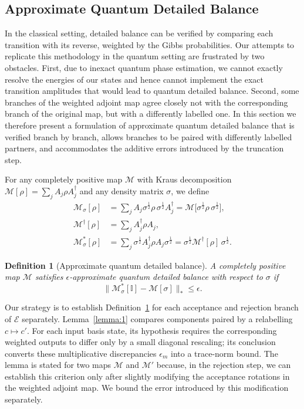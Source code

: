 \documentclass[aps,floatfix,10pt,amssymb,amsfont,amsmath,superscriptaddress,float,nofootinbib,longbibliography,nobalancelastpage,twocolumn]{revtex4-2}
\newtheorem{definition}{Definition}
\begin{document}
\subsection{Approximate Quantum Detailed Balance}
\label{section:detailedbalancedef}
In the classical setting, detailed balance can be verified by comparing each transition with its reverse, weighted by the Gibbs probabilities. Our attempts to replicate this methodology in the quantum setting are frustrated by two obstacles. First, due to inexact quantum phase estimation, we cannot exactly resolve the energies of our states and hence cannot implement the exact transition amplitudes that would lead to quantum detailed balance. Second, some branches of the weighted adjoint map agree closely not with the corresponding branch of the original map, but with a differently labelled one. In this section we therefore present a formulation of approximate quantum detailed balance that is verified branch by branch, allows branches to be paired with differently labelled partners, and accommodates the additive errors introduced by the truncation step.

For any completely positive map $\mathcal{M}$ with Kraus decomposition $\mathcal{M}[\rho] = \sum_{j} A_{j}\rho A^{\dagger}_{j}$ and any density matrix $\sigma$, we define
\begin{align}
    \mathcal{M}_{\sigma}[\rho] &= \sum_{j} A_{j}\sigma^{\frac{1}{2}}\rho\,\sigma^{\frac{1}{2}} A^{\dagger}_{j} = \mathcal{M}\big[\sigma^{\frac{1}{2}}\rho\,\sigma^{\frac{1}{2}}\big],\\
    \mathcal{M}^{\dagger}[\rho] &= \sum_j A^{\dagger}_j \rho A_j,\\
    \mathcal{M}^*_{\sigma}[\rho] &= \sum_{j} \sigma^{\frac{1}{2}}A^{\dagger}_{j}\rho A_{j}\sigma^{\frac{1}{2}} = \sigma^{\frac{1}{2}}\mathcal{M}^{\dagger}[\rho]\,\sigma^{\frac{1}{2}}.
\end{align}

\begin{definition}[Approximate quantum detailed balance]
\label{def:approxdb}
A completely positive map $\mathcal{M}$ satisfies $\epsilon$-approximate quantum
detailed balance with respect to $\sigma$ if
\begin{equation}
    \|\mathcal{M}^*_{\sigma}[\mathbb{I}] - \mathcal{M}[\sigma]\|_* \leq \epsilon.
\end{equation}
\end{definition}

Our strategy is to establish Definition~\ref{def:approxdb} for each acceptance and rejection branch of $\mathcal{E}$ separately. Lemma~\ref{lemma:1} compares components paired by a relabelling $c\mapsto c'$. For each input basis state, its hypothesis requires the corresponding weighted outputs to differ only by a small diagonal rescaling; its conclusion converts these multiplicative discrepancies $\epsilon_{m}$ into a trace-norm bound. The lemma is stated for two maps $\mathcal{M}$ and $\mathcal{M}'$ because, in the rejection step, we can establish this criterion only after slightly modifying the acceptance rotations in the weighted adjoint map. We bound the error introduced by this modification separately.
\end{document}
